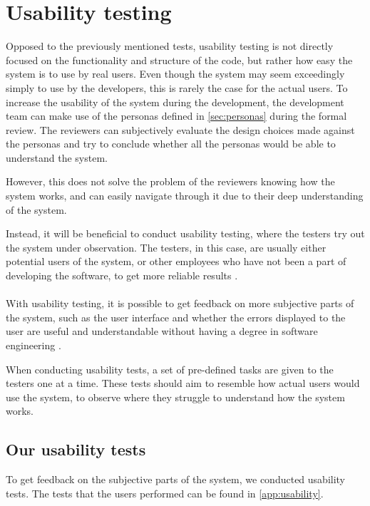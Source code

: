 \section{Usability testing} \label{sec:usability-test-section}
Opposed to the previously mentioned tests, usability testing is not directly focused on the functionality and structure of the code, but rather how easy the system is to use by real users.
Even though the system may seem exceedingly simply to use by the developers, this is rarely the case for the actual users.
To increase the usability of the system during the development, the development team can make use of the personas defined in \autoref{sec:personas} during the formal review.
The reviewers can subjectively evaluate the design choices made against the personas and try to conclude whether all the personas would be able to understand the system.

However, this does not solve the problem of the reviewers knowing how the system works, and can easily navigate through it due to their deep understanding of the system.

Instead, it will be beneficial to conduct usability testing, where the testers try out the system under observation.
The testers, in this case, are usually either potential users of the system, or other employees who have not been a part of developing the software, to get more reliable results \cite{SoftwareTesting}.
\\\\
With usability testing, it is possible to get feedback on more subjective parts of the system, such as the user interface and whether the errors displayed to the user are useful and understandable without having a degree in software engineering \cite{SoftwareTesting}.

When conducting usability tests, a set of pre-defined tasks are given to the testers one at a time.
These tests should aim to resemble how actual users would use the system, to observe where they struggle to understand how the system works.

\subsection{Our usability tests}
To get feedback on the subjective parts of the system, we conducted usability tests.
The tests that the users performed can be found in \autoref{app:usability}.

